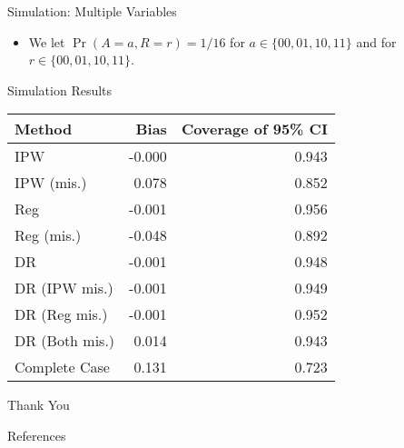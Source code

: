 \documentclass{beamer} %
\begin{document}
\begin{frame}{Simulation: Multiple Variables}
  \begin{itemize}
    \item We let $\Pr(A = a, R = r) = 1 / 16$ for $a \in \{00, 01, 10, 11\}$ and
      for $r \in \{00, 01, 10, 11\}$.
  \end{itemize}
\end{frame}

\begin{frame}{Simulation Results}
  \begin{center}
  \begin{tabular}{lrr}
    \toprule
    Method & Bias & Coverage of 95\% CI \\
    \midrule
    IPW             & -0.000 & 0.943 \\
    IPW (mis.)      &  0.078 & 0.852 \\
    Reg             & -0.001 & 0.956 \\
    Reg (mis.)      & -0.048 & 0.892 \\
    DR              & -0.001 & 0.948 \\
    DR (IPW mis.)   & -0.001 & 0.949 \\
    DR (Reg mis.)   & -0.001 & 0.952 \\
    DR (Both mis.)  &  0.014 & 0.943 \\
    Complete Case   &  0.131 & 0.723 \\
    \bottomrule
  \end{tabular}
  \end{center}
\end{frame}

\begin{frame}

  \begin{center}
    \Large
    Thank You
  \end{center}

\end{frame}

\begin{frame}{References}
  \printbibliography
\end{frame}

\end{document}
